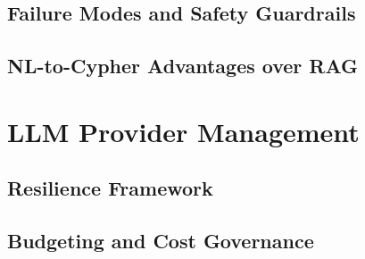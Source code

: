 \documentclass[a4paper,twoside]{sapthesis}
\begin{document}
\subsection{Failure Modes and Safety Guardrails}

\subsection{NL-to-Cypher Advantages over RAG}
%
%

\section{LLM Provider Management}
\label{sec:llm-providers}

\subsection{Resilience Framework}

\subsection{Budgeting and Cost Governance}
\end{document}
